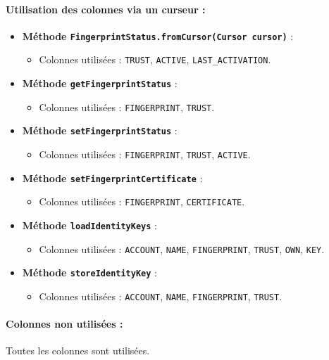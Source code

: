 \documentclass[a4paper,11pt]{article}
\begin{document}
\paragraph{Utilisation des colonnes via un curseur :}
\begin{itemize}
    \item \textbf{Méthode \texttt{FingerprintStatus.fromCursor(Cursor cursor)}} :
    \begin{itemize}
        \item Colonnes utilisées : \texttt{TRUST}, \texttt{ACTIVE}, \texttt{LAST\_ACTIVATION}.
    \end{itemize}
    \item \textbf{Méthode \texttt{getFingerprintStatus}} :
    \begin{itemize}
        \item Colonnes utilisées : \texttt{FINGERPRINT}, \texttt{TRUST}.
    \end{itemize}
    \item \textbf{Méthode \texttt{setFingerprintStatus}} :
    \begin{itemize}
        \item Colonnes utilisées : \texttt{FINGERPRINT}, \texttt{TRUST}, \texttt{ACTIVE}.
    \end{itemize}
    \item \textbf{Méthode \texttt{setFingerprintCertificate}} :
    \begin{itemize}
        \item Colonnes utilisées : \texttt{FINGERPRINT}, \texttt{CERTIFICATE}.
    \end{itemize}
    \item \textbf{Méthode \texttt{loadIdentityKeys}} :
    \begin{itemize}
        \item Colonnes utilisées : \texttt{ACCOUNT}, \texttt{NAME}, \texttt{FINGERPRINT}, \texttt{TRUST}, \texttt{OWN}, \texttt{KEY}.
    \end{itemize}
    \item \textbf{Méthode \texttt{storeIdentityKey}} :
    \begin{itemize}
        \item Colonnes utilisées : \texttt{ACCOUNT}, \texttt{NAME}, \texttt{FINGERPRINT}, \texttt{TRUST}.
    \end{itemize}
\end{itemize}

\paragraph{Colonnes non utilisées :}
\begin{itemize}
    Toutes les colonnes sont utilisées.
\end{itemize}
\end{document}

